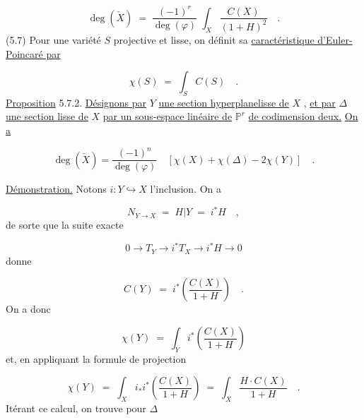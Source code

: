 \begin{equation}\tag{5.6.1}
\deg(\check{X}) \;=\; \frac{(-1)^r}{\deg(\varphi)} \; \int_X \frac{C(X)}{(1+H)^2} \quad .
\end{equation}
(5.7) Pour une variété $S$ projective et lisse, on définit sa \underline{caractéristique d'Euler-Poincaré par}

\begin{equation}\tag{5.7.1}
\chi(S) \;=\; \int_S C(S) \quad .
\end{equation}
\underline{Proposition} 5.7.2. \qquad \underline{Désignons par} $Y$ \underline{une section hyperplanelisse de} $X$ , \underline{et par} $\Delta$ \underline{une section lisse de} $X$ \underline{par un sous-espace linéaire de} $\mathbb{P}^r$ \underline{de codimension deux.} \underline{On a}

\begin{equation}\tag{5.7.3}
\deg(\check{X}) = \frac{(-1)^n}{\deg(\varphi)} \quad \left[ \chi(X) + \chi(\Delta) - 2\chi(Y) \right] \quad .
\end{equation}


\underline{Démonstration.} \quad Notons $i : Y \hookrightarrow X$ l'inclusion. On a

\begin{equation*}
N_{Y \longrightarrow X} \;=\; H|Y \;=\; i^{*}H \quad ,
\end{equation*}
de sorte que la suite exacte

\begin{equation*}
0 \longrightarrow T_Y \longrightarrow i^{*}T_X \longrightarrow i^{*}H \longrightarrow 0
\end{equation*}
donne

\begin{equation}\tag{5.7.4}
C(Y) \;=\; i^{*} \left( \frac{C(X)}{1+H} \right) \quad .
\end{equation}
On a donc

\begin{equation*}
\chi(Y) \;=\; \int_Y i^{*} \left( \frac{C(X)}{1+H} \right)
\end{equation*}
et, en appliquant la formule de projection

\begin{equation}\tag{5.7.5}
\chi(Y) \;=\; \int_X i_{*}i^{*} \left( \frac{C(X)}{1+H} \right) \;=\; \int_X \frac{H \cdot C(X)}{1 + H} \quad .
\end{equation}
Itérant ce calcul, on trouve pour $\Delta$

